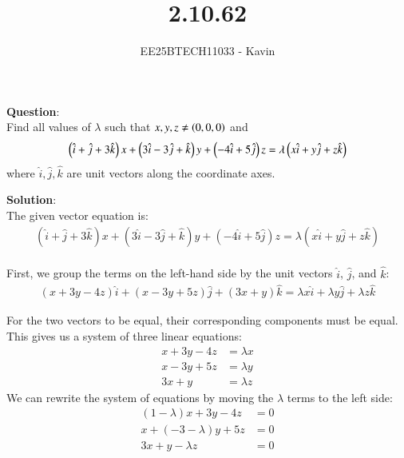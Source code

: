 \documentclass[journal]{IEEEtran}
\begin{document}

\vspace{3cm}

\title{2.10.62}
\author{EE25BTECH11033 - Kavin}
{\let\newpage\relax\maketitle}

\renewcommand{\thefigure}{\theenumi}
\renewcommand{\thetable}{\theenumi}
\setlength{\intextsep}{10pt} %
\textbf{Question}:\\
Find all values of $\lambda$ such that $x,y,z\neq\left(0,0,0\right)$ and $$\left(\hat{i}+\hat{j}+3\hat{k}\right)x+\left(3\hat{i}-3\hat{j}+\hat{k}\right)y+\left(-4\hat{i}+5\hat{j}\right)z=\lambda\left(x\hat{i}+y\hat{j}+z\hat{k}\right)$$ where $\hat{i}, \hat{j}, \hat{k}$ are unit vectors along the coordinate axes.\\
\bigskip

\textbf{Solution}:\\
The given vector equation is:
\begin{align}
(\hat{i} + \hat{j} + 3\hat{k})x + (3\hat{i} - 3\hat{j} + \hat{k})y + (-4\hat{i} + 5\hat{j})z = \lambda(x\hat{i} + y\hat{j} + z\hat{k})
\end{align}\\

First, we group the terms on the left-hand side by the unit vectors $\hat{i}$, $\hat{j}$, and $\hat{k}$:
\begin{align}
    (x + 3y - 4z)\hat{i} + (x - 3y + 5z)\hat{j} + (3x + y)\hat{k} = \lambda x\hat{i} + \lambda y\hat{j} + \lambda z\hat{k}
\end{align}


For the two vectors to be equal, their corresponding components must be equal. This gives us a system of three linear equations:
\begin{align}
    x + 3y - 4z &= \lambda x \\
    x - 3y + 5z &= \lambda y \\
    3x + y &= \lambda z
\end{align}
We can rewrite the system of equations by moving the $\lambda$ terms to the left side:
\begin{align}
    (1 - \lambda)x + 3y - 4z &= 0 \\
    x + (-3 - \lambda)y + 5z &= 0 \\
    3x + y - \lambda z &= 0
\end{align}
\end{document}

